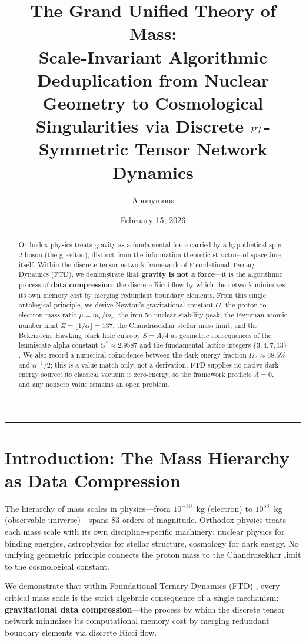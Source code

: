 \documentclass[11pt, letterpaper]{article}
\title{\vspace{-3em}\textbf{The Grand Unified Theory of Mass:\\ \large Scale-Invariant Algorithmic Deduplication from Nuclear Geometry to Cosmological Singularities via Discrete $\mathcal{PT}$-Symmetric Tensor Network Dynamics}}
\author[1]{Anonymous}
\affil[1]{\textit{Foundational Ternary Dynamics Research}}
\date{February 15, 2026}
\newcommand{\G}{G^*}
\theoremstyle{definition}
\theoremstyle{remark}
\begin{document}
\maketitle

\begin{abstract}
Orthodox physics treats gravity as a fundamental force carried by a hypothetical spin-2 boson (the graviton), distinct from the information-theoretic structure of spacetime itself. Within the discrete tensor network framework of Foundational Ternary Dynamics (FTD), we demonstrate that \textbf{gravity is not a force}---it is the algorithmic process of \textbf{data compression}: the discrete Ricci flow by which the network minimizes its own memory cost by merging redundant boundary elements. From this single ontological principle, we derive Newton's gravitational constant $G$, the proton-to-electron mass ratio $\mu = m_p/m_e$, the iron-56 nuclear stability peak, the Feynman atomic number limit $Z = \lfloor 1/\alpha \rfloor = 137$, the Chandrasekhar stellar mass limit, and the Bekenstein--Hawking black hole entropy $S = A/4$ as geometric consequences of the lemniscate-alpha constant $\G \approx 2.9587$ and the fundamental lattice integers $\{3, 4, 7, 13\}$. We also record a numerical coincidence between the dark energy fraction $\Omega_\Lambda \approx 68.5\%$ and $\alpha^{-1}/2$; this is a value-match only, not a derivation. FTD supplies no native dark-energy source: its classical vacuum is zero-energy, so the framework predicts $\Lambda = 0$, and any nonzero value remains an open problem.
\end{abstract}

\vspace{1em}
\hrule
\vspace{1.5em}

\section{Introduction: The Mass Hierarchy as Data Compression}

The hierarchy of mass scales in physics---from $10^{-30}$~kg (electron) to $10^{53}$~kg (observable universe)---spans 83 orders of magnitude. Orthodox physics treats each mass scale with its own discipline-specific machinery: nuclear physics for binding energies, astrophysics for stellar structure, cosmology for dark energy. No unifying geometric principle connects the proton mass to the Chandrasekhar limit to the cosmological constant.

We demonstrate that within Foundational Ternary Dynamics (FTD) \cite{Anon2026_Zenodo}, every critical mass scale is the strict algebraic consequence of a single mechanism: \textbf{gravitational data compression}---the process by which the discrete tensor network minimizes its computational memory cost by merging redundant boundary elements via discrete Ricci flow.
\end{document}
